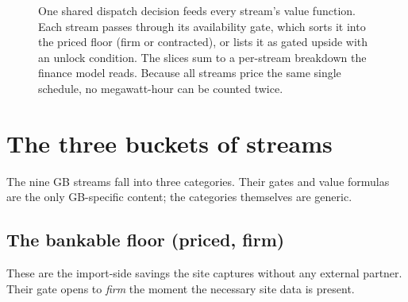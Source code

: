 \begin{figure}[H]
{}
\caption{One shared dispatch decision feeds every stream's value function. Each stream passes through its availability gate, which sorts it into the priced floor (firm or contracted), or lists it as gated upside with an unlock condition. The slices sum to a per-stream breakdown the finance model reads. Because all streams price the same single schedule, no megawatt-hour can be counted twice.}
\label{fig:valueflow}
\end{figure}

\section{The three buckets of streams}

The nine GB streams fall into three categories. Their gates and value formulas are the only GB-specific content; the categories themselves are generic.

\subsection{The bankable floor (priced, firm)}

These are the import-side savings the site captures without any external partner. Their gate opens to \emph{firm} the moment the necessary site data is present.

